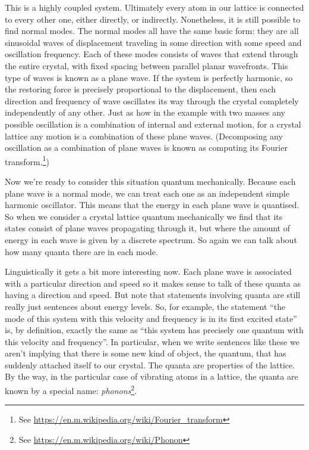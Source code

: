 \documentclass[a4paper]{article}
\begin{document}
This is a highly coupled system.
Ultimately every atom in our lattice is connected to every other one, either directly, or indirectly.
Nonetheless, it is still possible to find normal modes.
The normal modes all have the same basic form:
they are all sinusoidal waves of displacement traveling in some direction with some speed and oscillation frequency.
Each of these modes consists of waves that extend through the entire crystal, with fixed spacing between parallel planar wavefronts.
This type of waves is known as a plane wave.
If the system is perfectly harmonic, so the restoring force is precisely proportional to the displacement, then each direction and frequency of wave oscillates its way through the crystal completely independently of any other.
Just as how in the example with two masses any possible oscillation is a combination of internal and external motion, for a crystal lattice any motion is a combination of these plane waves.
(Decomposing any oscillation as a combination of plane waves is known as computing its Fourier transform.\footnote{See \url{https://en.m.wikipedia.org/wiki/Fourier_transform}})

Now we're ready to consider this situation quantum mechanically.
Because each plane wave is a normal mode, we can treat each one as an independent simple harmonic oscillator.
This means that the energy in each plane wave is quantised.
So when we consider a crystal lattice quantum mechanically we find that its states consist of plane waves propagating through it, but where the amount of energy in each wave is given by a discrete spectrum.
So again we can talk about how many quanta there are in each mode.

Linguistically it gets a bit more interesting now.
Each plane wave is associated with a particular direction and speed so it makes sense to talk of these quanta as having a direction and speed.
But note that statements involving quanta are still really just sentences about energy levels.
So, for example, the statement ``the mode of this system with this velocity and frequency is in its first excited state'' is, by definition, exactly the same as ``this system has precisely one quantum with this velocity and frequency''.
In particular, when we write sentences like these we aren't implying that there is some new kind of object, the quantum, that has suddenly attached itself to our crystal.
The quanta are properties of the lattice.
By the way, in the particular case of vibrating atoms in a lattice, the quanta are known by a special name: {\em phonons}\footnote{See \url{https://en.m.wikipedia.org/wiki/Phonon}}.
\end{document}
